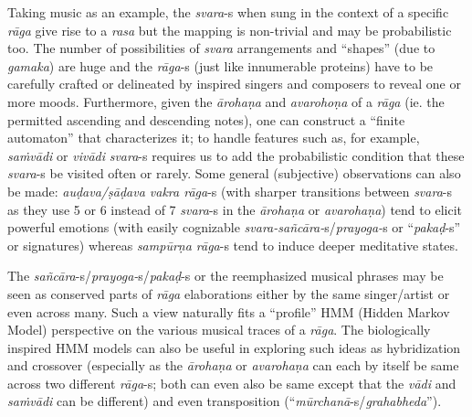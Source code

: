 Taking music as an example, the \textsl{svara}-s when sung in the context of a specific \textsl{rāga} give rise to a \textsl{rasa} but the mapping is non-trivial and may be probabilistic too. The number of possibilities of \textsl{svara} arrangements and “shapes” (due to \textsl{gamaka}) are huge and the \textsl{rāga}-s (just like innumerable proteins) have to be carefully crafted or delineated by inspired singers and composers to reveal one or more moods. Furthermore, given the \textsl{ārohaṇa} and \textsl{avarohoṇa} of a \textsl{rāga} (ie. the permitted ascending and descending notes), one can construct a “finite automaton” that characterizes it; to handle features such as, for example, \textsl{saṁvādi} or \textsl{vivādi} \textsl{svara}-s requires us to add the probabilistic condition that these \textsl{svara}-s be visited often or rarely. Some general (subjective) observations can also be made: \textsl{auḍava/ṣāḍava vakra rāga}-s (with sharper transitions between \textsl{svara}-s as they use 5 or 6 instead of 7 \textsl{svara}-s in the \textsl{ārohaṇa} or \textsl{avarohaṇa}) tend to elicit powerful emotions (with easily cognizable \textsl{svara-sañcāra-}s/\textsl{prayoga-}s or “\textsl{pakaḍ}-s” or signatures) whereas \textsl{sampūrṇa rāga}-s tend to induce deeper meditative states.

The \textsl{sañcāra}-s/\textsl{prayoga-}s/\textsl{pakaḍ}-s or the reemphasized musical phrases may be seen as conserved parts of \textsl{rāga} elaborations either by the same singer/artist or even across many. Such a view naturally fits a “profile” HMM (Hidden Markov Model) perspective on the various musical traces of a \textsl{rāga}. The biologically inspired HMM models can also be useful in exploring such ideas as hybridization and crossover (especially as the \textsl{ārohaṇa} or \textsl{avarohaṇa} can each by itself be same across two different \textsl{rāga}-s; both can even also be same except that the \textsl{vādi} and \textsl{saṁvādi} can be different) and even transposition (“\textsl{mūrchanā}-s/\textsl{grahabheda}”).

